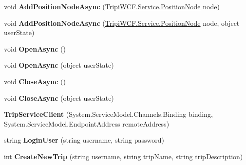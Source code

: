 \begin{DoxyCompactItemize}
\item 
\hypertarget{class_trip_service_client_a2f46a97c1e1e43c6aaa2dd1087fb59f3}{
void {\bfseries AddPositionNodeAsync} (\hyperlink{class_tripi_w_c_f_1_1_service_1_1_position_node}{TripiWCF.Service.PositionNode} node)}
\label{class_trip_service_client_a2f46a97c1e1e43c6aaa2dd1087fb59f3}

\item 
\hypertarget{class_trip_service_client_a96846c11d938c1877149a2334bb2d901}{
void {\bfseries AddPositionNodeAsync} (\hyperlink{class_tripi_w_c_f_1_1_service_1_1_position_node}{TripiWCF.Service.PositionNode} node, object userState)}
\label{class_trip_service_client_a96846c11d938c1877149a2334bb2d901}

\item 
\hypertarget{class_trip_service_client_a503f35d50a103ae9c704a8556a495317}{
void {\bfseries OpenAsync} ()}
\label{class_trip_service_client_a503f35d50a103ae9c704a8556a495317}

\item 
\hypertarget{class_trip_service_client_a766c4bf2b4c822c96d24bca6ab19de05}{
void {\bfseries OpenAsync} (object userState)}
\label{class_trip_service_client_a766c4bf2b4c822c96d24bca6ab19de05}

\item 
\hypertarget{class_trip_service_client_af7270b9fb14203468c5dc31e20a8481b}{
void {\bfseries CloseAsync} ()}
\label{class_trip_service_client_af7270b9fb14203468c5dc31e20a8481b}

\item 
\hypertarget{class_trip_service_client_a8e789b6b99bd805a926fc81c1c5b3f8a}{
void {\bfseries CloseAsync} (object userState)}
\label{class_trip_service_client_a8e789b6b99bd805a926fc81c1c5b3f8a}

\item 
\hypertarget{class_trip_service_client_a74f3aec249adc60fef595b722d37599c}{
{\bfseries TripServiceClient} (System.ServiceModel.Channels.Binding binding, System.ServiceModel.EndpointAddress remoteAddress)}
\label{class_trip_service_client_a74f3aec249adc60fef595b722d37599c}

\item 
\hypertarget{class_trip_service_client_a3afa56d820fedf2be986fa73c9eb0f8a}{
string {\bfseries LoginUser} (string username, string password)}
\label{class_trip_service_client_a3afa56d820fedf2be986fa73c9eb0f8a}

\item 
\hypertarget{class_trip_service_client_adabcca2baead495a63e7759d3ab9f12d}{
int {\bfseries CreateNewTrip} (string username, string tripName, string tripDescription)}
\label{class_trip_service_client_adabcca2baead495a63e7759d3ab9f12d}


\end{DoxyCompactItemize}
